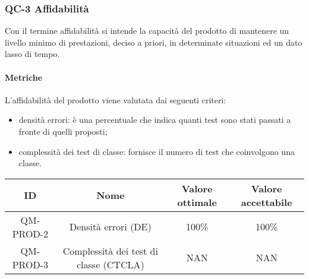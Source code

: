 \subsubsection{QC-3 Affidabilità}
Con il termine affidabilità si intende la capacità del prodotto di mantenere un livello minimo di prestazioni, deciso a priori, in determinate situazioni ed un dato lasso di tempo.

	\paragraph{Metriche}
	L'affidabilità del prodotto viene valutata dai seguenti criteri:
	\begin{itemize}
		\item densità errori: è una percentuale che indica quanti test sono stati passati a fronte di quelli proposti;
		\item complessità dei test di classe: fornisce il numero di test che coinvolgono una classe.
	\end{itemize}
	\begin{center}
		\begin{tabular}{|c|c|c|c|}
			\rowcolor{lighter-grayer}
			\hline
			ID & Nome & Valore ottimale & Valore accettabile \\
			\hline
			QM-PROD-2 & Densità errori (DE) & 100\% & 100\% \\
			\hline
			QM-PROD-3 & Complessità dei test di classe (CTCLA) & NAN & NAN \\
			\hline
		\end{tabular}
	\end{center}
